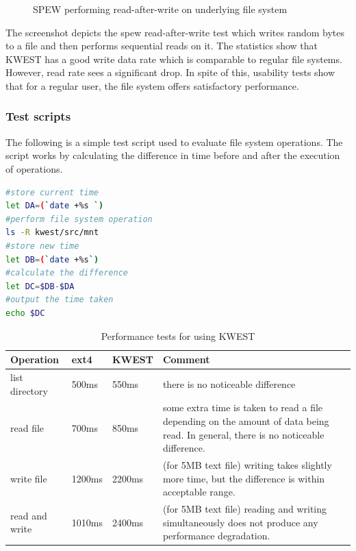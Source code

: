 \begin{figure}[htb]
\centering
\setlength\fboxsep{0pt}
\setlength\fboxrule{0.5pt}
\caption{SPEW performing read-after-write on underlying file system}
\label{fig:dfd0}
\end{figure}
The screenshot depicts the spew read-after-write test which writes random bytes to a file and then performs sequential reads on it. The statistics show that KWEST has a good write data rate which is comparable to regular file systems. However, read rate sees a significant drop. In spite of this, usability tests show that for a regular user, the file system offers satisfactory performance.

\newpage


\subsubsection{Test scripts} 
The following is a simple test script used to evaluate file system operations. The script works by calculating the difference in time before and after the execution of operations.
\begin{lstlisting}[language=bash,frame=single]
#store current time
let DA=(`date +%s `)
#perform file system operation
ls -R kwest/src/mnt
#store new time
let DB=(`date +%s`)
#calculate the difference
let DC=$DB-$DA
#output the time taken
echo $DC
\end{lstlisting}

\begin{table}[h]
\begin{tabular}{|p{2cm}|p{1.5cm}|p{1.5cm}|p{7cm}|}
\hline
\textbf{Operation} & \textbf{ext4} & \textbf{KWEST} & \textbf{Comment} \\ \hline
list directory	&	500ms	&	550ms & there is no noticeable difference \\ \hline
read file	&	700ms & 850ms	& some extra time is taken to read a file depending on the amount of data being read. In general, there is no noticeable difference. \\ \hline
write file	&	1200ms & 2200ms	& (for 5MB text file) writing takes slightly more time, but the difference is within acceptable range. \\ \hline
read and write	&	1010ms & 2400ms & (for 5MB text file) reading and writing simultaneously does not produce any performance degradation. \\
\hline
\end{tabular}
\caption{Performance tests for using KWEST}
\label{performancetests}
\end{table}

